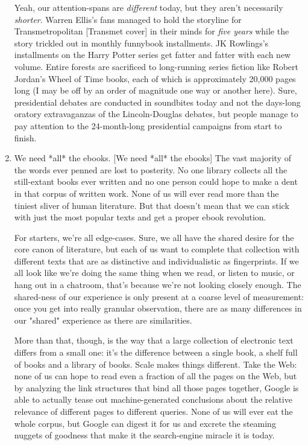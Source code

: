\begin{enumerate}
  Yeah, our attention-spans are \emph{different} today, but they
  aren't necessarily \emph{shorter}. Warren Ellis's fans managed to
  hold the storyline for Transmetropolitan [Transmet cover] in their
  minds for \emph{five years} while the story trickled out in
  monthly funnybook installments. JK Rowlings's installments on the
  Harry Potter series get fatter and fatter with each new volume.
  Entire forests are sacrificed to long-running series fiction like
  Robert Jordan's Wheel of Time books, each of which is approximately
  20,000 pages long (I may be off by an order of magnitude one way or
  another here). Sure, presidential debates are conducted in
  soundbites today and not the days-long oratory extravaganzas of the
  Lincoln-Douglas debates, but people manage to pay attention to the
  24-month-long presidential campaigns from start to finish.
  
\item
  We need *all* the ebooks. [We need *all* the ebooks] The vast
  majority of the words ever penned are lost to posterity. No one
  library collects all the still-extant books ever written and no one
  person could hope to make a dent in that corpus of written work.
  None of us will ever read more than the tiniest sliver of human
  literature. But that doesn't mean that we can stick with just the
  most popular texts and get a proper ebook revolution.

  For starters, we're all edge-cases. Sure, we all have the shared
  desire for the core canon of literature, but each of us want to
  complete that collection with different texts that are as
  distinctive and individualistic as fingerprints. If we all look
  like we're doing the same thing when we read, or listen to music,
  or hang out in a chatroom, that's because we're not looking closely
  enough. The shared-ness of our experience is only present at a
  coarse level of measurement: once you get into really granular
  observation, there are as many differences in our "shared"
  experience as there are similarities.
  
  More than that, though, is the way that a large collection of
  electronic text differs from a small one: it's the difference
  between a single book, a shelf full of books and a library of
  books. Scale makes things different. Take the Web: none of us can
  hope to read even a fraction of all the pages on the Web, but by
  analyzing the link structures that bind all those pages together,
  Google is able to actually tease out machine-generated conclusions
  about the relative relevance of different pages to different
  queries. None of us will ever eat the whole corpus, but Google can
  digest it for us and excrete the steaming nuggets of goodness that
  make it the search-engine miracle it is today.
  

\end{enumerate}
